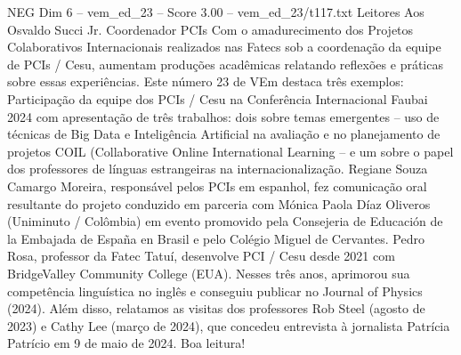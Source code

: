 \begin{textsample}{NEG Dim 6 – vem\_ed\_23 – Score 3.00 – vem\_ed\_23/t117.txt}  \label{ex:f6_neg_036}
Leitores Aos Osvaldo Succi Jr.
Coordenador PCIs Com o amadurecimento dos Projetos Colaborativos Internacionais realizados nas Fatecs sob a coordenação da equipe de PCIs / Cesu, aumentam produções acadêmicas relatando reflexões e práticas sobre essas experiências.
Este número 23 de VEm destaca três exemplos: Participação da equipe dos PCIs / Cesu na Conferência Internacional Faubai 2024 com apresentação de três trabalhos: dois sobre temas emergentes – uso de técnicas de Big Data e Inteligência Artificial na avaliação e no planejamento de projetos COIL (Collaborative Online International Learning – e um sobre o papel dos professores de línguas estrangeiras na internacionalização.
Regiane Souza Camargo Moreira, responsável pelos PCIs em espanhol, fez comunicação oral resultante do projeto conduzido em parceria com Mónica Paola Díaz Oliveros (Uniminuto / Colômbia) em evento promovido pela Consejeria de Educación de la Embajada de España en Brasil e pelo Colégio Miguel de Cervantes.
Pedro Rosa, professor da Fatec Tatuí, desenvolve PCI / Cesu desde 2021 com BridgeValley Community College (EUA).
Nesses três anos, aprimorou sua competência linguística no inglês e conseguiu publicar no Journal of Physics (2024).
Além disso, relatamos as visitas dos professores Rob Steel (agosto de 2023) e Cathy Lee (março de 2024), que concedeu entrevista à jornalista Patrícia Patrício em 9 de maio de 2024.
Boa leitura!

\end{textsample}
